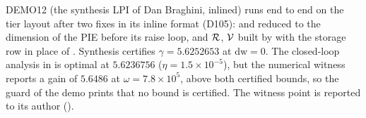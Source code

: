 DEMO12 (the synthesis LPI of Dan Braghini, inlined) runs end to end on the tier layout after two fixes in its inline format (D105):  and  reduced to the dimension of the PIE before its raise loop, and $\mathcal{R}$, $\mathcal{V}$ built by  with the storage row in place of . Synthesis certifies $\gamma=5.6252653$ at $\mathrm{dw}=0$. The closed-loop analysis in  is optimal at $5.6236756$ ($\eta=1.5\times10^{-5}$), but the numerical witness reports a gain of $5.6486$ at $\omega=7.8\times10^5$, above both certified bounds, so the guard of the demo prints that no bound is certified. The witness point is reported to its author ().
